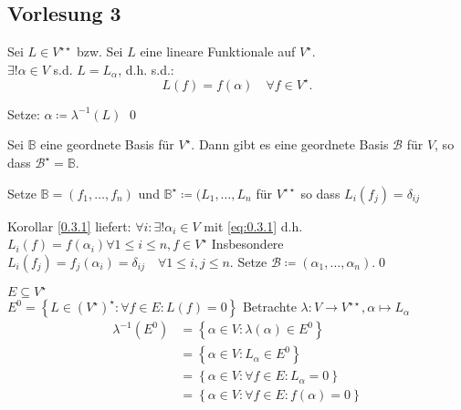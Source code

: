 \subsection{Vorlesung 3}
\begin{subcorollary}
	Sei $ L \in V^{\star \star }  $ bzw. Sei $ L $ eine lineare Funktionale auf $ V^\star  $.\\
	$ \exists ! \alpha \in V $ s.d. $ L = L_{\alpha} $, d.h. s.d.:
	\begin{equation}
		\label{eq:0.3.1}
		L(f) = f(\alpha) \quad \forall f \in V^\star.
	\end{equation}
	
\end{subcorollary}

\begin{subproof*}
	Setze: $ \alpha \coloneqq \lambda^{-1} (L) $ \qed
\end{subproof*}

\begin{subcorollary}
	Sei $ \mathbb{B} $ eine geordnete Basis für $ V^\star $. Dann gibt es eine geordnete Basis $ \mathcal{B}  $ für $ V $, so dass $ \mathcal{B} ^\star = \mathbb{B} $.
\end{subcorollary}

\begin{subproof*}
	Setze $ \mathbb{B} = (f_1, \dotsc, f_n) $ und $ \mathbb{B}^\star  \coloneqq (L_1, \dotsc, L_n $ für $ V^{\star \star }  $ so dass $ L_i (f_j) = \delta_{ij}  $ 
\end{subproof*}

Korollar \ref{0.3.1} liefert: $ \forall i : \exists ! \alpha_i \in V $ mit \eqref{eq:0.3.1} d.h. $ L_{i} (f) = f(\alpha_i) \forall 1 \leq i \leq n, f\in V^\star  $ Insbesondere $ L_{i} (f_j) = f_j(\alpha_i) = \delta_{ij} \quad \forall 1 \leq i,j \leq n $. Setze $ \mathcal{B} \coloneqq (\alpha_1, \dotsc, \alpha_n). $\qed

\begin{subexample}
	$ E \subseteq V^\star  $\\
	$ E^0 = \left\{ L \in \left( V^\star  \right) ^\star : \forall f \in E : L(f) = 0 \right\} $
	Betrachte $ \lambda : V \to V^{\star \star } , \alpha \mapsto L_\alpha $
	\begin{align*}
		\lambda^{-1} (E^0) &= \left\{ \alpha \in V : \lambda(\alpha) \in E^0 \right\} \\
		~&= \left\{ \alpha \in V : L_{\alpha} \in E^0 \right\} \\
		~&= \left\{ \alpha \in V : \forall f \in E : L_{\alpha} = 0 \right\}  \\
		~&= \left\{ \alpha \in V : \forall  f \in E : f(\alpha) = 0 \right\}  \\
	\end{align*}
\end{subexample}

